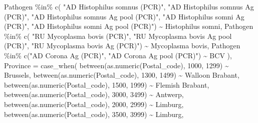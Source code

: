 \documentclass[
]{article}
\newenvironment{Shaded}{\begin{snugshade}}{\end{snugshade}}
\newcommand{\AttributeTok}[1]{\textcolor[rgb]{0.77,0.63,0.00}{#1}}
\newcommand{\DecValTok}[1]{\textcolor[rgb]{0.00,0.00,0.81}{#1}}
\newcommand{\FunctionTok}[1]{\textcolor[rgb]{0.00,0.00,0.00}{#1}}
\newcommand{\NormalTok}[1]{#1}
\newcommand{\SpecialCharTok}[1]{\textcolor[rgb]{0.00,0.00,0.00}{#1}}
\newcommand{\StringTok}[1]{\textcolor[rgb]{0.31,0.60,0.02}{#1}}
\begin{document}
\begin{Shaded}
\begin{Highlighting}[]
\NormalTok{      Pathogen }\SpecialCharTok{\%in\%} \FunctionTok{c}\NormalTok{(}
        \StringTok{"AD Histophilus somnus (PCR)"}\NormalTok{, }
        \StringTok{"AD Histophilus somnus Ag (PCR)"}\NormalTok{, }
        \StringTok{"AD Histophilus somnus Ag pool (PCR)"}\NormalTok{, }
        \StringTok{"AD Histophilus somni Ag (PCR)"}\NormalTok{,}
        \StringTok{"AD Histophilus somni Ag pool (PCR)"}\NormalTok{) }\SpecialCharTok{\textasciitilde{}} \StringTok{\textquotesingle{}Histophilus somni\textquotesingle{}}\NormalTok{,}
\NormalTok{      Pathogen }\SpecialCharTok{\%in\%} \FunctionTok{c}\NormalTok{(}
        \StringTok{"RU Mycoplasma bovis (PCR)"}\NormalTok{, }
        \StringTok{"RU Mycoplasma bovis Ag pool (PCR)"}\NormalTok{, }
        \StringTok{"RU Mycoplasma bovis Ag (PCR)"}\NormalTok{) }\SpecialCharTok{\textasciitilde{}} \StringTok{\textquotesingle{}Mycoplasma bovis\textquotesingle{}}\NormalTok{,}
\NormalTok{      Pathogen }\SpecialCharTok{\%in\%} \FunctionTok{c}\NormalTok{(}\StringTok{"AD Corona Ag (PCR)"}\NormalTok{, }\StringTok{"AD Corona Ag pool (PCR)"}\NormalTok{) }\SpecialCharTok{\textasciitilde{}} \StringTok{\textquotesingle{}BCV\textquotesingle{}}
\NormalTok{    ),}
      \AttributeTok{Province =} \FunctionTok{case\_when}\NormalTok{(}
        \FunctionTok{between}\NormalTok{(}\FunctionTok{as.numeric}\NormalTok{(Postal\_code), }\DecValTok{1000}\NormalTok{, }\DecValTok{1299}\NormalTok{) }\SpecialCharTok{\textasciitilde{}} \StringTok{\textquotesingle{}Brussels\textquotesingle{}}\NormalTok{,}
        \FunctionTok{between}\NormalTok{(}\FunctionTok{as.numeric}\NormalTok{(Postal\_code), }\DecValTok{1300}\NormalTok{, }\DecValTok{1499}\NormalTok{) }\SpecialCharTok{\textasciitilde{}} \StringTok{\textquotesingle{}Walloon Brabant\textquotesingle{}}\NormalTok{,}
        \FunctionTok{between}\NormalTok{(}\FunctionTok{as.numeric}\NormalTok{(Postal\_code), }\DecValTok{1500}\NormalTok{, }\DecValTok{1999}\NormalTok{) }\SpecialCharTok{\textasciitilde{}} \StringTok{\textquotesingle{}Flemish Brabant\textquotesingle{}}\NormalTok{,}
        \FunctionTok{between}\NormalTok{(}\FunctionTok{as.numeric}\NormalTok{(Postal\_code), }\DecValTok{3000}\NormalTok{, }\DecValTok{3499}\NormalTok{) }\SpecialCharTok{\textasciitilde{}} \StringTok{\textquotesingle{}Antwerp\textquotesingle{}}\NormalTok{,}
        \FunctionTok{between}\NormalTok{(}\FunctionTok{as.numeric}\NormalTok{(Postal\_code), }\DecValTok{2000}\NormalTok{, }\DecValTok{2999}\NormalTok{) }\SpecialCharTok{\textasciitilde{}} \StringTok{\textquotesingle{}Limburg\textquotesingle{}}\NormalTok{,}
        \FunctionTok{between}\NormalTok{(}\FunctionTok{as.numeric}\NormalTok{(Postal\_code), }\DecValTok{3500}\NormalTok{, }\DecValTok{3999}\NormalTok{) }\SpecialCharTok{\textasciitilde{}} \StringTok{\textquotesingle{}Limburg\textquotesingle{}}\NormalTok{,}

\end{Highlighting}
\end{Shaded}
\end{document}
